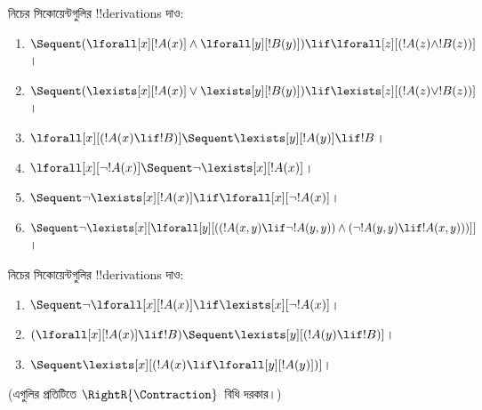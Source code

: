 \documentclass[../../../include/open-logic-section]{subfiles}
\begin{document}
\begin{prob}
নিচের সিকোয়েন্টগুলির !!{derivation}s দাও:
\begin{enumerate}
\item $\Sequent (\lforall[x][!A(x)] \land \lforall[y][!B(y)]) \lif
\lforall[z][(!A(z) \land !B(z))]$।
\item $\Sequent (\lexists[x][!A(x)] \lor \lexists[y][!B(y)]) \lif
\lexists[z][(!A(z) \lor !B(z))]$।
\item $\lforall[x][(!A(x) \lif !B)] \Sequent \lexists[y][!A(y)] \lif !B$।
\item $\lforall[x][\lnot !A(x)] \Sequent \lnot\lexists[x][!A(x)]$।
\item $\Sequent \lnot\lexists[x][!A(x)] \lif \lforall[x][\lnot !A(x)]$।
\item $\Sequent \lnot\lexists[x][\lforall[y][((!A(x,y) \lif \lnot
!A(y,y)) \land (\lnot !A(y,y) \lif !A(x,y)))]]$।
\end{enumerate}
\end{prob}

\begin{prob}
নিচের সিকোয়েন্টগুলির !!{derivation}s দাও:
\begin{enumerate}
\item $\Sequent \lnot\lforall[x][!A(x)] \lif \lexists[x][\lnot!A(x)]$।
\item $(\lforall[x][!A(x)] \lif !B) \Sequent \lexists[y][(!A(y) \lif !B)]$।
\item $\Sequent \lexists[x][(!A(x) \lif \lforall[y][!A(y)])]$।
\end{enumerate}
(এগুলির প্রতিটিতে $\RightR{\Contraction}$~বিধি দরকার।)
\end{prob}
\end{document}
